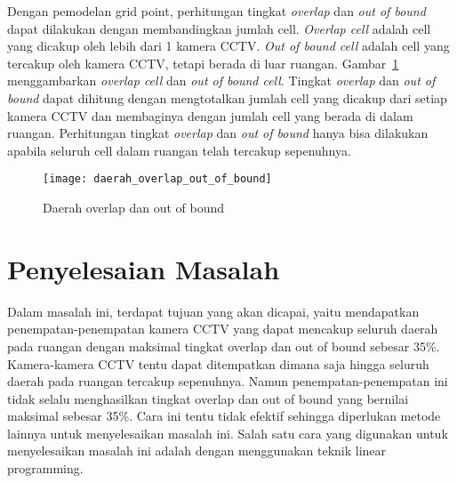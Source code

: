 Dengan pemodelan grid point, perhitungan tingkat \textit{overlap} dan \textit{out of bound} dapat dilakukan dengan membandingkan jumlah cell. \textit{Overlap cell} adalah cell yang dicakup oleh lebih dari 1 kamera CCTV. \textit{Out of bound cell} adalah cell yang tercakup oleh kamera CCTV, tetapi berada di luar ruangan. Gambar~\ref{fig:daerah_overlap_out_of_bound} menggambarkan \textit{overlap cell} dan \textit{out of bound cell}. Tingkat \textit{overlap} dan \textit{out of bound} dapat dihitung dengan mengtotalkan jumlah cell yang dicakup dari setiap kamera CCTV dan membaginya dengan jumlah cell yang berada di dalam ruangan. Perhitungan tingkat \textit{overlap} dan \textit{out of bound} hanya bisa dilakukan apabila seluruh cell dalam ruangan telah tercakup sepenuhnya.

\begin{figure}[h]
	\centering  
	\texttt{[image: daerah\_overlap\_out\_of\_bound]}
	\caption[Daerah overlap dan out of bound]{Daerah overlap dan out of bound}
	\label{fig:daerah_overlap_out_of_bound}
\end{figure}



\section{Penyelesaian Masalah}
Dalam masalah ini, terdapat tujuan yang akan dicapai, yaitu mendapatkan penempatan-penempatan kamera CCTV yang dapat mencakup seluruh daerah pada ruangan dengan maksimal tingkat overlap dan out of bound sebesar 35\%. Kamera-kamera CCTV tentu dapat ditempatkan dimana saja hingga seluruh daerah pada ruangan tercakup sepenuhnya. Namun penempatan-penempatan ini tidak selalu menghasilkan tingkat overlap dan out of bound yang bernilai maksimal sebesar 35\%. Cara ini tentu tidak efektif sehingga diperlukan metode lainnya untuk menyelesaikan masalah ini. Salah satu cara yang digunakan untuk menyelesaikan masalah ini adalah dengan menggunakan teknik linear programming.

